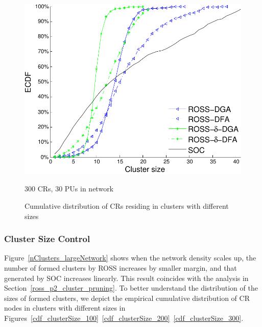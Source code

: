 \documentclass[10pt,journal,compsoc]{IEEEtran}
\theoremstyle{mytheoremstyle}
\theoremstyle{mytheoremstyle}
\theoremstyle{mytheoremstyle}
\begin{document}
\begin{figure}[t]
\begin{multicols}{3}
    \includegraphics[width=\linewidth]{cdf_clusterSize_300.pdf}\par\caption{300 CRs, 30 PUs in network}\label{cdf_clusterSize_300}
\end{multicols}
\caption{Cumulative distribution of CRs residing in clusters with different sizes}
\label{cdf_100_200_300}
\end{figure}

\subsubsection{Cluster Size Control}
Figure~\ref{nClusters_largeNetwork} shows when the network density scales up, the number of formed clusters by ROSS increases by smaller margin, and that generated by SOC increases linearly.
This result coincides with the analysis in Section~\ref{ross_p2_cluster_pruning}.
To better understand the distribution of the sizes of formed clusters, we depict the empirical cumulative distribution of CR nodes in clusters with different sizes in Figures~\ref{cdf_clusterSize_100}~\ref{cdf_clusterSize_200}~\ref{cdf_clusterSize_300}.
\end{document}
